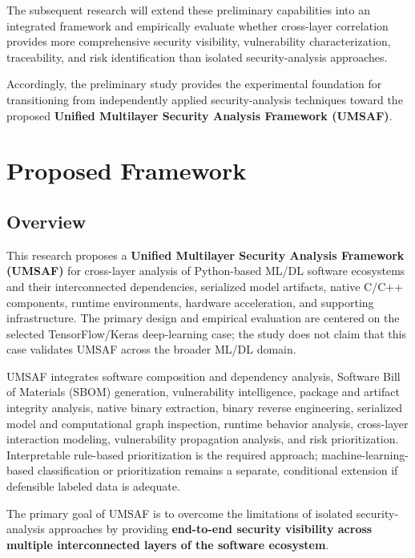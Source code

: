 \documentclass[
  12pt,
  letterpaper,
  oneside]{report}
\begin{document}
The subsequent research will extend these preliminary capabilities into
an integrated framework and empirically evaluate whether cross-layer
correlation provides more comprehensive security visibility,
vulnerability characterization, traceability, and risk identification
than isolated security-analysis approaches.

Accordingly, the preliminary study provides the experimental foundation
for transitioning from independently applied security-analysis
techniques toward the proposed \textbf{Unified Multilayer Security
Analysis Framework (UMSAF)}.

\chapter{Proposed Framework}\label{10-proposed-framework}

\section{Overview}\label{101-overview}

This research proposes a \textbf{Unified Multilayer Security Analysis
Framework (UMSAF)} for cross-layer analysis of Python-based ML/DL
software ecosystems and their interconnected dependencies, serialized
model artifacts, native C/C++ components, runtime environments, hardware
acceleration, and supporting infrastructure. The primary design and
empirical evaluation are centered on the selected TensorFlow/Keras
deep-learning case; the study does not claim that this case validates
UMSAF across the broader ML/DL domain.

UMSAF integrates software composition and dependency analysis, Software
Bill of Materials (SBOM) generation, vulnerability intelligence, package
and artifact integrity analysis, native binary extraction, binary
reverse engineering, serialized model and computational graph
inspection, runtime behavior analysis, cross-layer interaction modeling,
vulnerability propagation analysis, and risk prioritization.
Interpretable rule-based prioritization is the required approach;
machine-learning-based classification or prioritization remains a
separate, conditional extension if defensible labeled data is adequate.

The primary goal of UMSAF is to overcome the limitations of isolated
security-analysis approaches by providing \textbf{end-to-end security
visibility across multiple interconnected layers of the software
ecosystem}.
\end{document}
